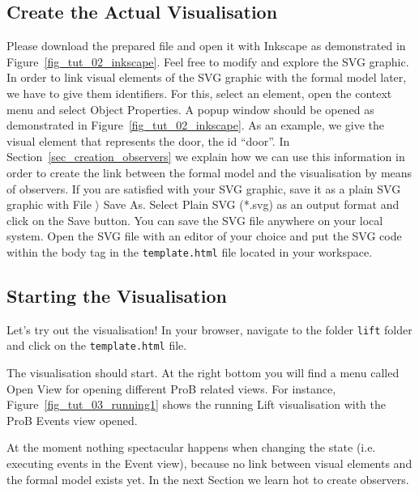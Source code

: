 \subsection{Create the Actual Visualisation}

Please download the prepared  file and open it with Inkscape as demonstrated in Figure~\ref{fig_tut_02_inkscape}.
Feel free to modify and explore the SVG graphic.
In order to link visual elements of the SVG graphic with the formal model later, we have to give them identifiers. 
For this, select an element, open the context menu and select \textsf{Object Properties}.
A popup window should be opened as demonstrated in Figure~\ref{fig_tut_02_inkscape}.
As an example, we give the visual element that represents the door, the id ``door''.
In Section~\ref{sec_creation_observers} we explain how we can use this information in order to create the link between the formal model and the visualisation by means of observers.
If you are satisfied with your SVG graphic, save it as a plain SVG graphic with \textsf{File $\rangle$ Save As}.
Select \textsf{Plain SVG (*.svg)} as an output format and click on the \textsf{Save} button.
You can save the SVG file anywhere on your local system. 
Open the SVG file with an editor of your choice and put the SVG code within the body tag in the \texttt{template.html} file located in your workspace.

\subsection{Starting the Visualisation}

Let's try out the visualisation!
In your browser, navigate to the folder \texttt{lift} folder and click on the \texttt{template.html} file.

The visualisation should start.
At the right bottom you will find a menu called \textsf{Open View} for opening different ProB related views.
For instance, Figure~\ref{fig_tut_03_running1} shows the running Lift visualisation with the ProB Events view opened.

At the moment nothing spectacular happens when changing the state (i.e. executing events in the Event view), because no link between visual elements and the formal model exists yet.
In the next Section we learn hot to create observers.

